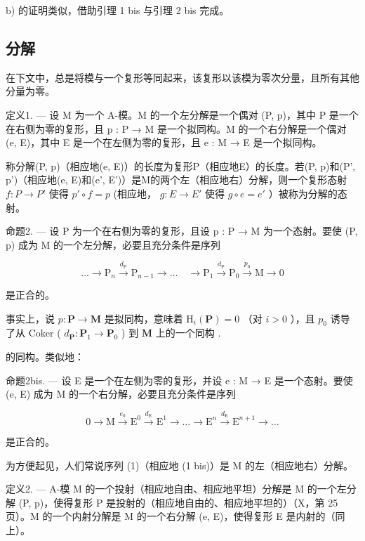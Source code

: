 b) 的证明类似，借助引理 1 bis 与引理 2 bis 完成。

\subsection{分解}

在下文中，总是将模与一个复形等同起来，该复形以该模为零次分量，且所有其他分量为零。

定义1. --- 设 M 为一个 A-模。M 的一个左分解是一个偶对 (P, p)，其中 P 是一个在右侧为零的复形，且 p : P → M 是一个拟同构。M 的一个右分解是一个偶对 (e, E)，其中 E 是一个在左侧为零的复形，且 e : M → E 是一个拟同构。

称分解(P, p)（相应地(e, E)）的长度为复形P（相应地E）的长度。若(P, p)和(P', p')（相应地(e, E)和(e', E')）是M的两个左（相应地右）分解，则一个复形态射 \(f: P \to P'\) 使得 \(p' \circ f = p\) (相应地， \(g: E \to E'\) 使得 \(g \circ e = e'\) ）被称为分解的态射。

命题2. --- 设 P 为一个在右侧为零的复形，且设 p : P → M 为一个态射。要使 (P, p) 成为 M 的一个左分解，必要且充分条件是序列

\[
\dots \longrightarrow \mathrm{P} _ {n} \xrightarrow {d _ {\mathrm{P}}} \mathrm{P} _ {n - 1} \longrightarrow \dots \quad \longrightarrow \mathrm{P} _ {1} \xrightarrow {d _ {\mathrm{P}}} \mathrm{P} _ {0} \xrightarrow {p _ {0}} \mathrm{M} \longrightarrow 0\tag{1}
\]

是正合的。

事实上，说 \(p: \mathbf{P} \to \mathbf{M}\) 是拟同构，意味着 \(\mathrm{H}_{i}(\mathbf{P}) = 0\) （对 \(i > 0\) ），且 \(p_{0}\) 诱导了从 Coker ( \(d_{\mathbf{P}}: \mathbf{P}_{1} \to \mathbf{P}_{0}\) ) 到 \(\mathbf{M}\) 上的一个同构 .

的同构。类似地：

命题2bis. --- 设 E 是一个在左侧为零的复形，并设 e : M → E 是一个态射。要使 (e, E) 成为 M 的一个右分解，必要且充分条件是序列

\[
0 \longrightarrow \mathrm{M} \stackrel {e _ {0}} {\longrightarrow} \mathrm{E} ^ {0} \stackrel {d _ {\mathrm{E}}} {\longrightarrow} \mathrm{E} ^ {1} \longrightarrow \dots \longrightarrow \mathrm{E} ^ {n} \stackrel {d _ {\mathrm{E}}} {\longrightarrow} \mathrm{E} ^ {n + 1} \longrightarrow \dots\tag{1 bis}
\]

是正合的。

为方便起见，人们常说序列 (1)（相应地 (1 bis)）是 M 的左（相应地右）分解。

定义2. --- A-模 M 的一个投射（相应地自由、相应地平坦）分解是 M 的一个左分解 (P, p)，使得复形 P 是投射的（相应地自由的、相应地平坦的）（X，第 25 页）。M 的一个内射分解是 M 的一个右分解 (e, E)，使得复形 E 是内射的（同上）。

